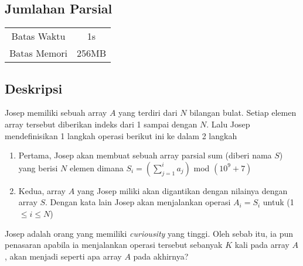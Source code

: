\documentclass{article}
\begin{document}
\begin{center}
    \section*{Jumlahan Parsial} %

    \begin{tabular}{ | c c | }
        \hline
        Batas Waktu  & 1s \\    %
        Batas Memori & 256MB \\  %
        \hline
    \end{tabular}
\end{center}

\subsection*{Deskripsi}




Josep memiliki sebuah array $A$ yang terdiri dari $N$ bilangan bulat. Setiap elemen array tersebut diberikan 
indeks dari 1 sampai dengan $N$. Lalu Josep mendefinisikan 1 langkah operasi berikut ini ke dalam 2 langkah
\begin{enumerate}
    \item Pertama, Josep akan membuat sebuah array parsial sum (diberi nama $S$) yang berisi $N$ elemen dimana
          ${S_i} = (\sum_{j=1}^ia_j) $ mod $(10^9 + 7)$
    \item Kedua, array $A$ yang Josep miliki akan digantikan dengan nilainya dengan array $S$. Dengan kata lain
    Josep akan menjalankan operasi $A_i = S_i$ untuk (1 $\leq i \leq N $)
\end{enumerate}

Josep adalah orang yang memiliki \textit{curiousity} yang tinggi. Oleh sebab itu, ia pun penasaran apabila
ia menjalankan operasi tersebut sebanyak $K$ kali pada array $A$, akan menjadi seperti apa array $A$ pada akhirnya?


\end{document}

